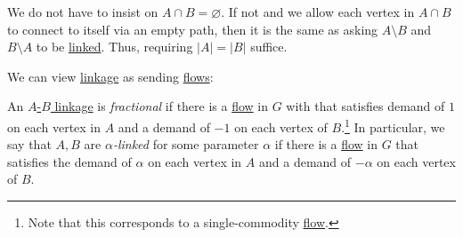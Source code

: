 \begin{note}
	We do not have to insist on \(A \cap B = \varnothing \). If not and we allow each vertex in \(A \cap B\) to connect to itself via an empty path, then it is the same as asking \(A\setminus B\) and \(B\setminus A\) to be \hyperref[def:linkage]{linked}. Thus, requiring \(\lvert A \rvert = \lvert B \rvert \) suffice.
\end{note}

We can view \hyperref[def:linkage]{linkage} as sending \hyperref[def:flow]{flows}:

\begin{definition}\label{def:fractional-linkage}
	An \hyperref[def:linkage]{\(A\)-\(B\) linkage} is \emph{fractional} if there is a \hyperref[def:flow]{flow} in \(G\) with that satisfies demand of \(1\) on each vertex in \(A\) and a demand of \(-1\) on each vertex of \(B\).\footnote{Note that this corresponds to a single-commodity \hyperref[def:flow]{flow}.} In particular, we say that \(A, B\) are \emph{\(\alpha \)-linked} for some parameter \(\alpha \) if there is a \hyperref[def:flow]{flow} in \(G\) that satisfies the demand of \(\alpha \) on each vertex in \(A\) and a demand of \(-\alpha \) on each vertex of \(B\).
\end{definition}

